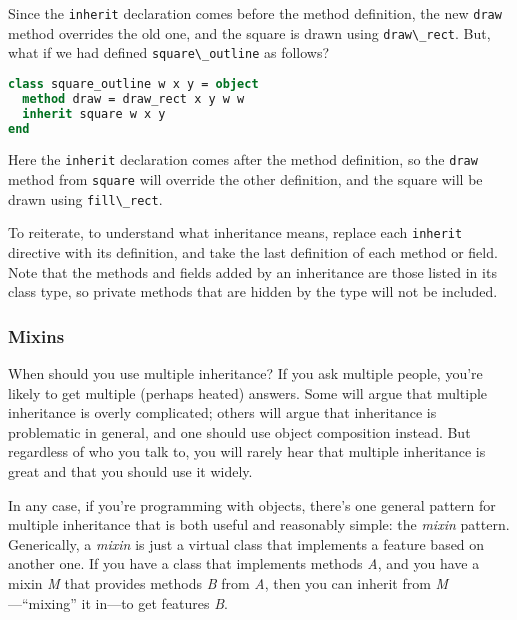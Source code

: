 Since the \passthrough{\lstinline!inherit!} declaration comes before the
method definition, the new \passthrough{\lstinline!draw!} method
overrides the old one, and the square is drawn using
\passthrough{\lstinline!draw\_rect!}. But, what if we had defined
\passthrough{\lstinline!square\_outline!} as follows?

\begin{lstlisting}[language=Caml]
class square_outline w x y = object
  method draw = draw_rect x y w w
  inherit square w x y
end
\end{lstlisting}

Here the \passthrough{\lstinline!inherit!} declaration comes after the
method definition, so the \passthrough{\lstinline!draw!} method from
\passthrough{\lstinline!square!} will override the other definition, and
the square will be drawn using \passthrough{\lstinline!fill\_rect!}.

To reiterate, to understand what inheritance means, replace each
\passthrough{\lstinline!inherit!} directive with its definition, and
take the last definition of each method or field. Note that the methods
and fields added by an inheritance are those listed in its class type,
so private methods that are hidden by the type will not be included.

\hypertarget{mixins}{%
\subsubsection{Mixins}\label{mixins}}

When should you use multiple inheritance? If you ask multiple people,
you're likely to get multiple (perhaps heated) answers. Some will argue
that multiple inheritance is overly complicated; others will argue that
inheritance is problematic in general, and one should use object
composition instead. But regardless of who you talk to, you will rarely
hear that multiple inheritance is great and that you should use it
widely. 

In any case, if you're programming with objects, there's one general
pattern for multiple inheritance that is both useful and reasonably
simple: the \emph{mixin} pattern. Generically, a \emph{mixin} is just a
virtual class that implements a feature based on another one. If you
have a class that implements methods \emph{A}, and you have a mixin
\emph{M} that provides methods \emph{B} from \emph{A}, then you can
inherit from \emph{M}---``mixing'' it in---to get features \emph{B}.

